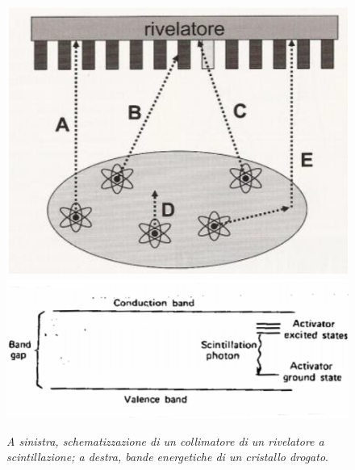 \documentclass{report}
\numberwithin{equation}{section}
\numberwithin{figure}{section}
\begin{document}
\begin{description}
\begin{figure}[htp]
    \centering
    \includegraphics[scale=0.6]{immagini/collimatore.png}\quad\includegraphics[scale=0.9]{immagini/scinti.png}
    \caption{\label{fig:collimatore} \textit{A sinistra, schematizzazione di un collimatore di un rivelatore a scintillazione; a destra, bande energetiche di un cristallo drogato}.}
\end{figure}


\end{description}
\end{document}
